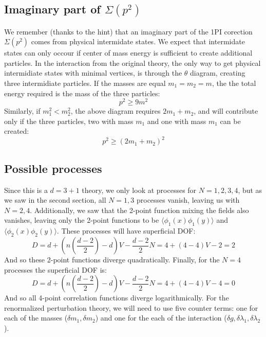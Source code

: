 \documentclass{article}
\begin{document}
\subsection{Imaginary part of $\Sigma(p^2)$}
We remember (thanks to the hint) that an imaginary part of the 1PI corection $\Sigma(p^2)$ comes from physical intermidate states. We expect that intermidate states can only occour if center of mass energy is sufficient to create additional particles.  In the interaction from the original theory, the only way to get physical intermidiate states with minimal vertices, is through the $\theta$ diagram, creating three intermidiate particles.
\newline
If the masses are equal $m_1 = m_2 = m$, the the total energy required is the mass of the three particles:
\begin{equation}
    p^2 \ge 9m^2
\end{equation}
Similarly, if $m_1^2 < m_2^2$, the above diagram requires $2m_1 + m_2$, and will contribute only if the three particles, two with mass $m_1$ and one with mass $m_1$ can be created:
\begin{equation}
    p^2 \ge (2m_1 + m_2)^2
\end{equation}
\subsection{Possible processes}
Since this is a $d = 3 + 1$ theory, we only look at processes for $N = 1, 2, 3, 4$, but as we saw in the second section, all $N = 1, 3$ processes vanish, leaving us with $N = 2, 4$. Additionally, we saw that the 2-point function mixing the fields also vanishes, leaving only the 2-point functions to be $\langle \phi_1(x) \phi_1(y) \rangle$ and $\langle \phi_2(x) \phi_2(y) \rangle$. These processes will have superficial DOF:
\begin{equation}
    D = d + \left(n\left(\frac{d - 2}{2}\right) - d\right)V - \frac{d - 2}{2}N = 
    4 + \left(4 - 4\right)V - 2 = 2
\end{equation}
And so these 2-point functions diverge quadratically.
\newline
Finally, for the $N = 4$ processes the superficial DOF is:
\begin{equation}
    D = d + \left(n\left(\frac{d - 2}{2}\right) - d\right)V - \frac{d - 2}{2}N = 
    4 + \left(4 - 4\right)V - 4 = 0
\end{equation}
And so all 4-point correlation functions diverge logarithmically.
\newline
For the renormalized perturbation theory, we will need to use five counter terms: one for each of the masses ($\delta m_1, \delta m_2$) and one for the each of the interaction ($\delta g, \delta \lambda_1, \delta \lambda_2$).
\end{document}
